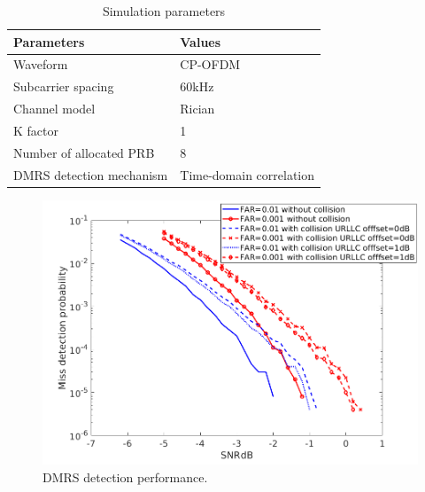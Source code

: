 \documentclass{ieeeaccess}
\begin{document}
\begin{table}[htbp]
\caption{Simulation parameters}
\begin{center}
\begin{tabular}{|p{8em}|p{8em}|}
 \hline
 \textbf{Parameters} & \textbf{Values}\\
 \hline
 Waveform & CP-OFDM\\
 \hline
 Subcarrier spacing & 60kHz\\
 \hline
 Channel model & Rician\\
 \hline
 K factor & 1\\
 \hline
 Number of allocated PRB & 8\\
 \hline
 DMRS detection mechanism & Time-domain correlation\\
 

 
 \hline
\end{tabular}
\label{tab5}
\end{center}

\end{table}

\begin{figure}[htbp]
\centerline{\includegraphics[scale=0.33]{fig16.png}}
\caption{DMRS detection performance.}
\label{fig16}
\vspace{-3mm}
\end{figure}
\end{document}
